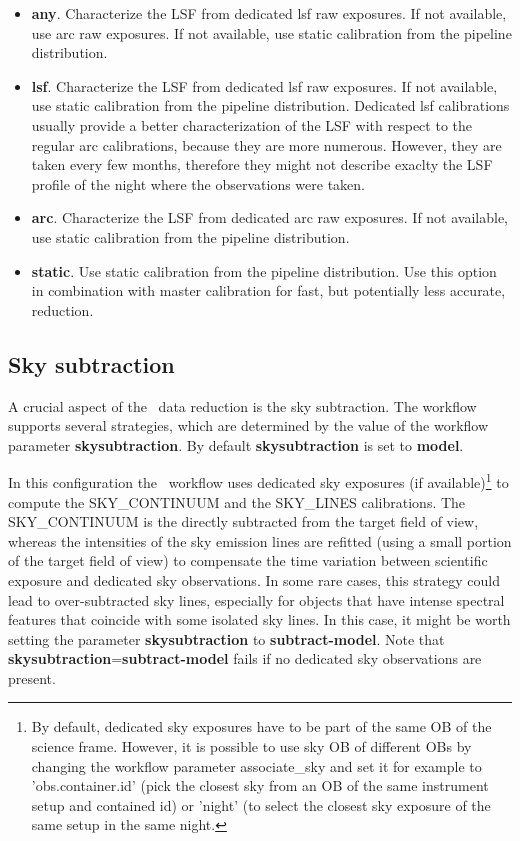 \begin{itemize}
\item {\bf any}.  Characterize the LSF from dedicated lsf raw
  exposures. If not available, use arc raw exposures. If not
  available, use static calibration from the pipeline distribution.

\item {\bf lsf}.  Characterize the LSF from dedicated lsf raw
  exposures. If not available, use static calibration from the
  pipeline distribution. Dedicated lsf calibrations usually provide a
  better characterization of the LSF with respect to the regular arc
  calibrations, because they are more numerous. However, they are
  taken every few months, therefore they might not describe exaclty
  the LSF profile of the night where the observations were taken.

\item {\bf arc}.  Characterize the LSF from dedicated arc raw
  exposures. If not available, use static calibration from the
  pipeline distribution.

\item{\bf static}. Use static calibration from the pipeline
  distribution. Use this option in combination with master calibration
  for fast, but potentially less accurate, reduction.

\end{itemize}

\subsection{Sky subtraction}
\label{sec:configuration_sky_subtraction}


A crucial aspect of the \instname\ data reduction is the sky
subtraction. The workflow supports several strategies, which are
determined by the value of the workflow parameter {\bf
  skysubtraction}.  By default {\bf skysubtraction} is set to {\bf
  model}.

In this configuration the \instname\ workflow uses dedicated sky
exposures (if available)\footnote{By default, dedicated sky exposures
have to be part of the same OB of the science frame. However, it is
possible to use sky OB of different OBs by changing the workflow
parameter associate\_sky and set it for example to 'obs.container.id'
(pick the closest sky from an OB of the same instrument setup and
contained id) or 'night' (to select the closest sky exposure of the
same setup in the same night.} to compute the SKY\_CONTINUUM and the
SKY\_LINES calibrations. The SKY\_CONTINUUM is the directly subtracted
from the target field of view, whereas the intensities of the sky
emission lines are refitted (using a small portion of the target field
of view) to compensate the time variation between scientific exposure
and dedicated sky observations.  In some rare cases, this strategy
could lead to over-subtracted sky lines, especially for objects that
have intense spectral features that coincide with some isolated sky
lines. In this case, it might be worth setting the parameter {\bf
  skysubtraction} to {\bf subtract-model}. Note that {\bf
  skysubtraction}={\bf subtract-model} fails if no dedicated sky
observations are present.

